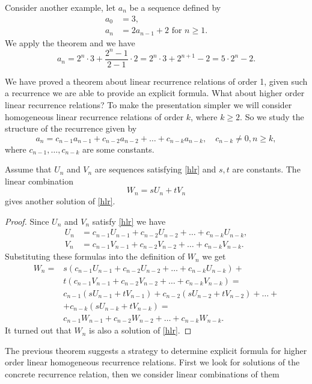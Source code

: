 Consider another example, let $a_n$ be a sequence defined by
\begin{align*}
a_0&=3,\\
a_n&=2a_{n-1}+2 \mbox{ for }n\geq 1.
\end{align*}
We apply the theorem and we have
$$
a_n=2^n\cdot 3+\frac{2^n-1}{2-1}\cdot 2=2^n\cdot 3+2^{n+1}-2=5\cdot 2^n-2.
$$

We have proved a theorem about linear recurrence relations of order 1, given such a recurrence
we are able to provide an explicit formula. What about higher order linear recurrence relations?
To make the presentation simpler we will consider homogeneous linear recurrence relations of order $k$,
where $k\geq 2$. So we study the structure of the recurrence given by
\begin{equation}\label{hlr}
a_n=c_{n-1}a_{n-1}+c_{n-2}a_{n-2}+\ldots+c_{n-k}a_{n-k},\quad c_{n-k}\neq 0, n\geq k,
\end{equation}
where $c_{n-1},\ldots,c_{n-k}$ are some constants.
\begin{theorem}\label{UV}
Assume that $U_n$ and $V_n$ are sequences satisfying \eqref{hlr} and $s,t$ are constants.
The linear combination
$$
W_n=sU_n+tV_n
$$
gives another solution of \eqref{hlr}.
\end{theorem}
\begin{proof}
Since $U_n$ and $V_n$ satisfy \eqref{hlr} we have
\begin{align*}
U_n&=c_{n-1}U_{n-1}+c_{n-2}U_{n-2}+\ldots+c_{n-k}U_{n-k},\\
V_n&=c_{n-1}V_{n-1}+c_{n-2}V_{n-2}+\ldots+c_{n-k}V_{n-k}.
\end{align*}
Substituting these formulas into the definition of $W_n$ we get
\begin{align*}
W_n=&s(c_{n-1}U_{n-1}+c_{n-2}U_{n-2}+\ldots+c_{n-k}U_{n-k})+\\
&t(c_{n-1}V_{n-1}+c_{n-2}V_{n-2}+\ldots+c_{n-k}V_{n-k})=\\
&c_{n-1}(sU_{n-1}+tV_{n-1})+c_{n-2}(sU_{n-2}+tV_{n-2})+\ldots+\\
&+c_{n-k}(sU_{n-k}+tV_{n-k})=\\
&c_{n-1}W_{n-1}+c_{n-2}W_{n-2}+\ldots+c_{n-k}W_{n-k}.
\end{align*}
It turned out that $W_n$ is also a solution of \eqref{hlr}.
\end{proof}
The previous theorem suggests a strategy to determine explicit formula
for higher order linear homogeneous recurrence relations. First we look for solutions
of the concrete recurrence relation, then we consider linear combinations of them
